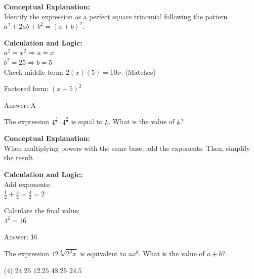 \documentclass[11pt,paper=a4,answers]{exam}
\begin{document}
\begin{questions}
\begin{solution}
\textbf{Conceptual Explanation:} \\
Identify the expression as a perfect square trinomial following the pattern $a^2 + 2ab + b^2 = (a+b)^2$.

\vspace{20pt}

\textbf{Calculation and Logic:} \\
$a^2 = x^2 \Rightarrow a = x$ \\
$b^2 = 25 \Rightarrow b = 5$ \\
Check middle term: $2(x)(5) = 10x$. (Matches)

\vspace{10pt}

Factored form: $(x+5)^2$

\vspace{25pt}

Answer: \colorbox{yellow!100}{A}
\end{solution}

\vspace{40pt}

\question
The expression $4^{\frac{1}{2}} \cdot 4^{\frac{3}{2}}$ is equal to $k$. What is the value of $k$?

\begin{solution}
\textbf{Conceptual Explanation:} \\
When multiplying powers with the same base, add the exponents. Then, simplify the result.

\vspace{20pt}

\textbf{Calculation and Logic:} \\
Add exponents: \\
$\frac{1}{2} + \frac{3}{2} = \frac{4}{2} = 2$

\vspace{10pt}

Calculate the final value: \\
$4^2 = 16$

\vspace{25pt}

Answer: \colorbox{yellow!100}{16}
\end{solution}

\vspace{40pt}

\question
The expression $12\sqrt[4]{2^4 x}$ is equivalent to $ax^b$. What is the value of $a + b$?
\begin{tasks}(4)
    \task $24.25$
    \task $12.25$
    \task $48.25$
    \task $24.5$
\end{tasks}


\end{questions}
\end{document}
